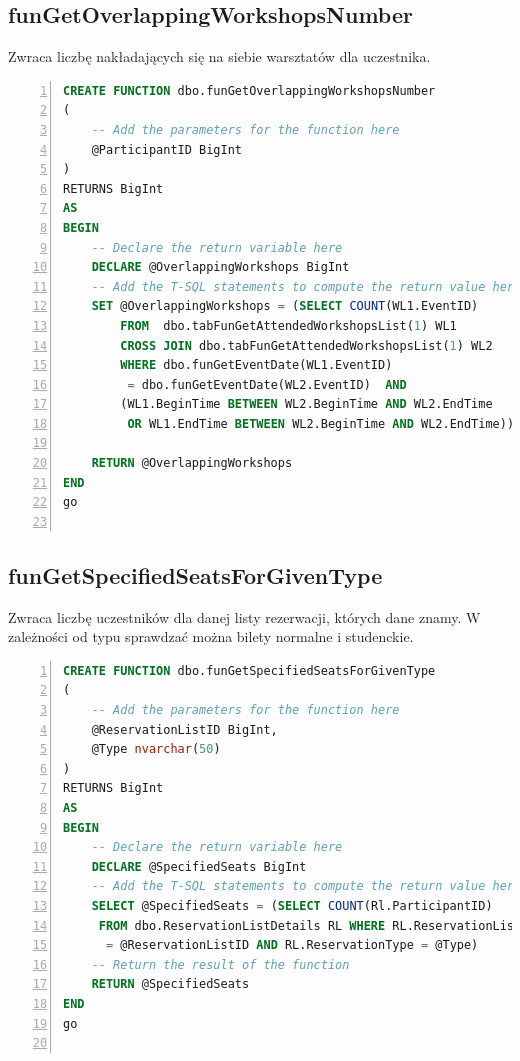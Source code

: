 \documentclass[]{article}
\begin{document}
	\subsection{funGetOverlappingWorkshopsNumber}
	Zwraca liczbę nakładających się na siebie warsztatów dla uczestnika.
	\begin{lstlisting}[language=SQL,
	showspaces=false,
	basicstyle=\ttfamily,
	numbers=left,
	numberstyle=\tiny,
	backgroundcolor=\color{lightg},
	keywordstyle=\color{lightblue},
	commentstyle=\color{gray}]
CREATE FUNCTION dbo.funGetOverlappingWorkshopsNumber
(
	-- Add the parameters for the function here
	@ParticipantID BigInt
)
RETURNS BigInt
AS
BEGIN
	-- Declare the return variable here
	DECLARE @OverlappingWorkshops BigInt
	-- Add the T-SQL statements to compute the return value here
	SET @OverlappingWorkshops = (SELECT COUNT(WL1.EventID)
		FROM  dbo.tabFunGetAttendedWorkshopsList(1) WL1
		CROSS JOIN dbo.tabFunGetAttendedWorkshopsList(1) WL2
		WHERE dbo.funGetEventDate(WL1.EventID)
		 = dbo.funGetEventDate(WL2.EventID)  AND
		(WL1.BeginTime BETWEEN WL2.BeginTime AND WL2.EndTime
		 OR WL1.EndTime BETWEEN WL2.BeginTime AND WL2.EndTime))
	
	RETURN @OverlappingWorkshops
END
go
	
	\end{lstlisting}
	
	\subsection{funGetSpecifiedSeatsForGivenType}
	Zwraca liczbę uczestników dla danej listy rezerwacji, których dane znamy. W zależności od typu sprawdzać można bilety normalne i studenckie.
	\begin{lstlisting}[language=SQL,
	showspaces=false,
	basicstyle=\ttfamily,
	numbers=left,
	numberstyle=\tiny,
	backgroundcolor=\color{lightg},
	keywordstyle=\color{lightblue},
	commentstyle=\color{gray}]
CREATE FUNCTION dbo.funGetSpecifiedSeatsForGivenType
(
	-- Add the parameters for the function here
	@ReservationListID BigInt,
	@Type nvarchar(50)
)
RETURNS BigInt
AS
BEGIN
	-- Declare the return variable here
	DECLARE @SpecifiedSeats BigInt
	-- Add the T-SQL statements to compute the return value here
	SELECT @SpecifiedSeats = (SELECT COUNT(Rl.ParticipantID)
	 FROM dbo.ReservationListDetails RL WHERE RL.ReservationListID
	  = @ReservationListID AND RL.ReservationType = @Type)
	-- Return the result of the function
	RETURN @SpecifiedSeats
END
go
	
	\end{lstlisting}
	\pagebreak
\end{document}

